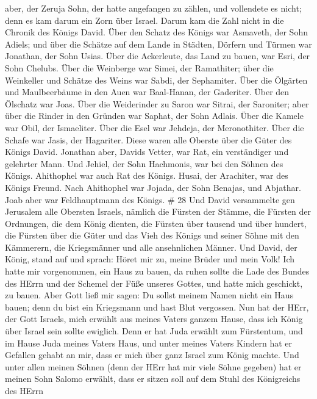 aber, der Zeruja Sohn, der hatte angefangen zu zählen, und vollendete es
nicht; denn es kam darum ein Zorn über Israel. Darum kam die Zahl nicht
in die Chronik des Königs David.  Über den Schatz des
Königs war Asmaveth, der Sohn Adiels; und über die Schätze auf dem Lande
in Städten, Dörfern und Türmen war Jonathan, der Sohn Usias.
 Über die Ackerleute, das Land zu bauen, war Esri, der Sohn
Chelubs.  Über die Weinberge war Simei, der Ramathiter;
über die Weinkeller und Schätze des Weins war Sabdi, der Sephamiter.
 Über die Ölgärten und Maulbeerbäume in den Auen war
Baal-Hanan, der Gaderiter. Über den Ölschatz war Joas. 
Über die Weiderinder zu Saron war Sitrai, der Saroniter; aber über die
Rinder in den Gründen war Saphat, der Sohn Adlais.  Über
die Kamele war Obil, der Ismaeliter. Über die Esel war Jehdeja, der
Meronothiter.  Über die Schafe war Jasis, der Hagariter.
Diese waren alle Oberste über die Güter des Königs David. 
Jonathan aber, Davids Vetter, war Rat, ein verständiger und gelehrter
Mann. Und Jehiel, der Sohn Hachmonis, war bei den Söhnen des Königs.
 Ahithophel war auch Rat des Königs. Husai, der Arachiter,
war des Königs Freund.  Nach Ahithophel war Jojada, der
Sohn Benajas, und Abjathar. Joab aber war Feldhauptmann des Königs. \#
28  Und David versammelte gen Jerusalem alle Obersten
Israels, nämlich die Fürsten der Stämme, die Fürsten der Ordnungen, die
dem König dienten, die Fürsten über tausend und über hundert, die
Fürsten über die Güter und das Vieh des Königs und seiner Söhne mit den
Kämmerern, die Kriegsmänner und alle ansehnlichen Männer. 
Und David, der König, stand auf und sprach: Höret mir zu, meine Brüder
und mein Volk! Ich hatte mir vorgenommen, ein Haus zu bauen, da ruhen
sollte die Lade des Bundes des HErrn und der Schemel der Füße unseres
Gottes, und hatte mich geschickt, zu bauen.  Aber Gott ließ
mir sagen: Du sollst meinem Namen nicht ein Haus bauen; denn du bist ein
Kriegsmann und hast Blut vergossen.  Nun hat der HErr, der
Gott Israels, mich erwählt aus meines Vaters ganzem Hause, dass ich
König über Israel sein sollte ewiglich. Denn er hat Juda erwählt zum
Fürstentum, und im Hause Juda meines Vaters Haus, und unter meines
Vaters Kindern hat er Gefallen gehabt an mir, dass er mich über ganz
Israel zum König machte.  Und unter allen meinen Söhnen
(denn der HErr hat mir viele Söhne gegeben) hat er meinen Sohn Salomo
erwählt, dass er sitzen soll auf dem Stuhl des Königreichs des HErrn
